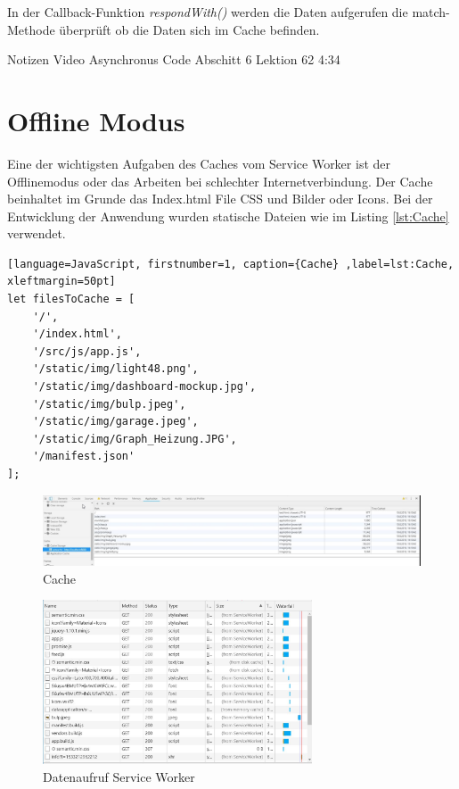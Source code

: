 In der Callback-Funktion \textit{respondWith()} werden die Daten aufgerufen die match-Methode überprüft ob die Daten sich im Cache befinden.

		
Notizen Video
	Asynchronus Code Abschitt 6 Lektion 62 4:34 
	 
\clearpage
\section{Offline Modus}
Eine der wichtigsten Aufgaben des Caches vom Service Worker ist der Offlinemodus oder das Arbeiten bei schlechter Internetverbindung. Der Cache beinhaltet im Grunde das Index.html File CSS und Bilder oder Icons. Bei der Entwicklung der Anwendung wurden statische Dateien wie im Listing \ref{lst:Cache} verwendet.


\begin{lstlisting}[language=JavaScript, firstnumber=1, caption={Cache} ,label=lst:Cache, xleftmargin=50pt]
let filesToCache = [
    '/',
    '/index.html',
    '/src/js/app.js',
    '/static/img/light48.png',
    '/static/img/dashboard-mockup.jpg',
    '/static/img/bulp.jpeg',
    '/static/img/garage.jpeg',
    '/static/img/Graph_Heizung.JPG',
    '/manifest.json'
];
\end{lstlisting}


\begin{figure}[h]
	\centering
	\includegraphics[width=16cm]{BilderAllgemein/Implementierung/Cache.jpg}\medskip
	\caption{Cache}
	\label{fig:Cache}
\end{figure}  

\begin{figure}[h]
	\centering
	\includegraphics[width=8cm]{BilderAllgemein/Implementierung/aufruf_SW_Browser.jpg}\medskip
	\caption{Datenaufruf Service Worker}
	\label{fig:aufrufSWBrowser}
\end{figure}  

